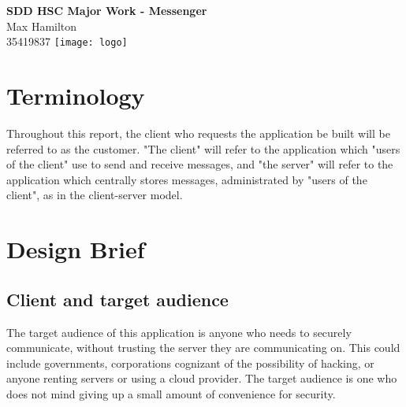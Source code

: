 \documentclass{article}
\begin{document}
\begin{titlepage}
    \begin{center}
        { \Huge\textbf{
            SDD HSC Major Work - Messenger
        }}\\[0.5cm]
        { \huge
            Max Hamilton\\[0.3cm]
            35419837
        }
        \texttt{[image: logo]}
    \end{center}
    
\end{titlepage}
\tableofcontents
\newpage
\section{Terminology}
Throughout this report, the client who requests the application be built will be referred to as the customer. "The client" will refer to the application which "users of the client" use to send and receive messages, and "the server" will refer to the application which centrally stores messages, administrated by "users of the client", as in the client-server model.\\
\section{Design Brief}
\subsection{Client and target audience}
The target audience of this application is anyone who needs to securely communicate, without trusting the server they are communicating on. This could include governments, corporations cognizant of the possibility of hacking, or anyone renting servers or using a cloud provider. The target audience is one who does not mind giving up a small amount of convenience for security.
\end{document}
